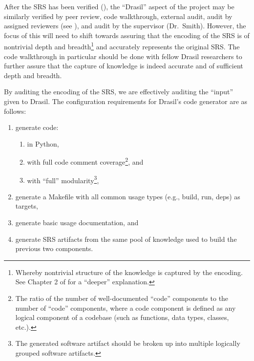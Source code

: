 \documentclass[12pt, titlepage]{article}
\begin{document}
After the SRS has been verified (), the ``Drasil''
aspect of the project may be similarly verified by peer review, code
walkthrough, external audit, audit by assigned reviewers (see
), and audit by the supervisor (Dr.~Smith). However, the
focus of this will need to shift towards assuring that the encoding of the SRS
is of nontrivial depth and breadth\footnote{Whereby nontrivial structure of
    the knowledge is captured by the encoding. See Chapter 2 of \cite{Balaci2022MSc}
    for a ``deeper'' explanation.} and accurately represents the original SRS. The
code walkthrough in particular should be done with fellow Drasil researchers to
further assure that the capture of knowledge is indeed accurate and of
sufficient depth and breadth.

By auditing the encoding of the SRS, we are effectively auditing the ``input''
given to Drasil. The configuration requirements for Drasil's code generator are
as follows:

\begin{enumerate}

    \item generate code:

          \begin{enumerate}

              \item in Python,

              \item with full code comment coverage\footnote{The ratio of the
                        number of well-documented ``code'' components to the
                        number of ``code'' components, where a code component is
                        defined as any logical component of a codebase (such as
                        functions, data types, classes, etc.).}, and

              \item with ``full'' modularity\footnote{The generated software
                        artifact should be broken up into multiple logically
                        grouped software artifacts.},

          \end{enumerate}

    \item generate a Makefile with all common usage types (e.g., build, run,
          deps) as targets,

    \item generate basic usage documentation, and

    \item generate SRS artifacts from the same pool of knowledge used to build
          the previous two components.

\end{enumerate}
\end{document}
